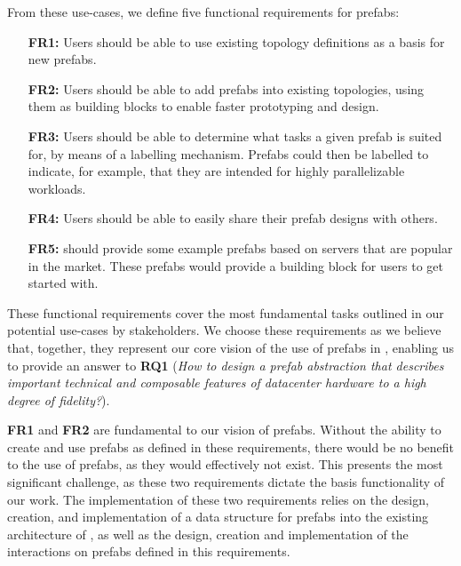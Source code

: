\documentclass[11pt]{article}
\begin{document}
		From these use-cases, we define five functional requirements for prefabs:
		\begin{itemize}
			\item [\textbf{FR1:}] Users should be able to use existing topology definitions as a basis for new prefabs.
			\item [\textbf{FR2:}] Users should be able to add prefabs into existing topologies, using them as building blocks to enable faster prototyping and design.
			\item [\textbf{FR3:}] Users should be able to determine what tasks a given prefab is suited for, by means of a labelling mechanism. Prefabs could then be labelled to indicate, for example, that they are intended for highly parallelizable workloads.
			\item [\textbf{FR4:}] Users should be able to easily share their prefab designs with others.
			\item [\textbf{FR5:}] \opendc{} should provide some example prefabs based on servers that are popular in the market. These prefabs would provide a building block for users to get started with.
		\end{itemize}

		These functional requirements cover the most fundamental tasks outlined in our potential use-cases by stakeholders.
		We choose these requirements as we believe that, together, they represent our core vision of the use of prefabs in \opendc{}, enabling us to provide an answer to \textbf{RQ1} (\textit{How to design a prefab abstraction that describes important technical and composable features of datacenter hardware to a high degree of fidelity?}).

		\textbf{FR1} and \textbf{FR2} are fundamental to our vision of prefabs.
		Without the ability to create and use prefabs as defined in these requirements, there would be no benefit to the use of prefabs, as they would effectively not exist.
		This presents the most significant challenge, as these two requirements dictate the basis functionality of our work.
		The implementation of these two requirements relies on the design, creation, and implementation of a data structure for prefabs into the existing architecture of \opendc{}, as well as the design, creation and implementation of the interactions on prefabs defined in this requirements.
\end{document}

